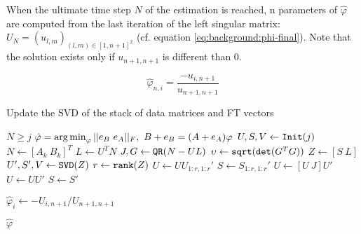 \documentclass[/home/francois/latex/report/main.tex]{subfiles}
\begin{document}
When the ultimate time step $N$ of the estimation is reached, n parameters of $\hat{\varphi}$ are computed from the last iteration of the left singular matrix: $U_{N} = (u_{l,m})_{(l, m) \in [1,n+1]^2}$ (cf. equation \ref{eq:background:phi-final}). Note that the solution exists only if $u_{n+1, n+1}$ is different than 0.

\begin{equation}
  \label{eq:background:phi-final}
  \hat{\varphi}_{n, i} = \frac{-u_{i, n+1}}{u_{n+1, n+1}}
\end{equation}

\begin{algorithm}
\caption{Update the \ac{SVD} of the stack of data matrices and \ac{FT} vectors}
\begin{algorithmic}
\REQUIRE $N \geq j$
\ENSURE $\hat{\varphi} = \argmin_{\varphi} ||e_B \ e_A||_F, \ B + e_B = (A + e_A) \varphi$
\STATE $U, S, V \leftarrow \text{\texttt{Init}}(j)$
\STATE $N \leftarrow [A_k \ B_k]^T$
\STATE $L \leftarrow U^T N$
\STATE $J, G \leftarrow \text{\texttt{QR}}(N - UL)$
\STATE $\upsilon \leftarrow \text{\texttt{sqrt}}(\text{\texttt{det}}(G^TG))$
\IF{$\upsilon \leq \varepsilon$}
\STATE $Z \leftarrow [S \ L]$
\STATE $U', S', V \leftarrow \text{\texttt{SVD}}(Z)$
\STATE $r \leftarrow \text{\texttt{rank}}(Z)$
\STATE $U \leftarrow U U_{1:r, 1:r}'$
\STATE $S \leftarrow S_{1:r, 1:r}'$
\ELSE
\STATE $U \leftarrow [U \ J] U'$
\STATE $U \leftarrow U U'$
\STATE $S \leftarrow S'$
\ENDIF
\ENDFOR

\STATE $\hat{\varphi}_i \leftarrow -U_{i, n+1} / U_{n+1, n+1}$
\ENDFOR

\RETURN $\hat{\varphi}$
\end{algorithmic}
\end{algorithm}
\end{document}
